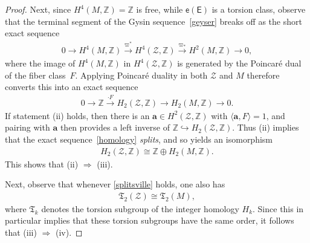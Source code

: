 \documentclass[pdftex]{sigma}
\numberwithin{equation}{section}
\def\ZZ{\mathbb{Z}}
\begin{document}
\begin{proof}
Next, since $H^4(M, \ZZ)= \ZZ$ is free, while $\mathsf{e} (\mathsf{E})$ is a torsion class, observe that
the terminal segment of the Gysin sequence~\eqref{geyser} breaks off as the short exact sequence
\begin{gather*}
0\to H^4(M, \ZZ) \stackrel{\varpi^*}{\to} H^4 (\mathcal{Z}, \ZZ) \stackrel{\varpi_*}{\to} H^2 (M, \ZZ) \to 0,
\end{gather*}
where the image of $H^4(M,\ZZ)$ in $H^4 (\mathcal{Z},\ZZ)$ is generated by the Poincar\'e dual of the
fiber class~$F$. Applying Poincar\'e duality in both $\mathcal {Z}$ and $M$ therefore converts this into an exact sequence
\begin{gather}\label{homology}
0\to\ZZ \stackrel{\cdot F}{\to} H_2 (\mathcal{Z}, \ZZ) {\to} H_2 (M, \ZZ) \to 0.
\end{gather}
If statement (ii) holds, then there is
 an $\mathbf{a}\in H^2(\mathcal{Z}, \ZZ )$ with $\langle \mathbf{a} , F\rangle =1$, and pairing with $\mathbf{a}$
 then provides a left inverse of $\ZZ \hookrightarrow H_2 (\mathcal{Z}, \ZZ)$.
Thus (ii) implies that the exact
sequence~\eqref{homology} {\em splits}, and so yields an isomorphism
\begin{gather}
\label{splitsville}
H_2(\mathcal{Z}, \ZZ) \cong \ZZ\oplus H_2 (M, \ZZ ).
\end{gather}
This shows that (ii) $\Longrightarrow$ (iii).

Next, observe that whenever \eqref{splitsville} holds, one also has
\begin{gather*}
\mathfrak{T}_2 (\mathcal{Z} ) \cong \mathfrak{T}_2 (M),
\end{gather*}
where $\mathfrak{T}_k$ denotes the torsion subgroup of the integer homology $H_k$.
Since this in particular implies that these torsion subgroups have the same order,
it follows that (iii) $\Longrightarrow$ (iv).


\end{proof}
\end{document}

